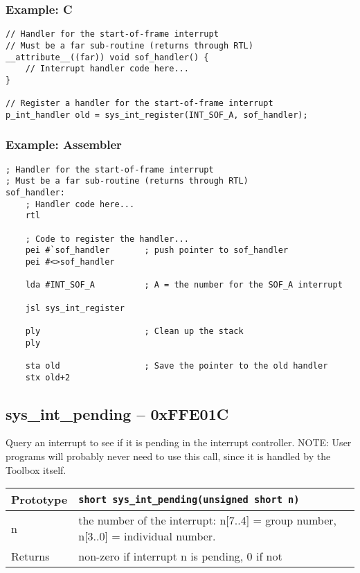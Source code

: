 \subsubsection*{Example: C}
\begin{lstlisting}
// Handler for the start-of-frame interrupt
// Must be a far sub-routine (returns through RTL)
__attribute__((far)) void sof_handler() {
	// Interrupt handler code here...
}

// Register a handler for the start-of-frame interrupt
p_int_handler old = sys_int_register(INT_SOF_A, sof_handler);
\end{lstlisting}

\subsubsection*{Example: Assembler}
\begin{verbatim}
; Handler for the start-of-frame interrupt
; Must be a far sub-routine (returns through RTL)
sof_handler:
    ; Handler code here...
    rtl

    ; Code to register the handler...
    pei #`sof_handler       ; push pointer to sof_handler
    pei #<>sof_handler

    lda #INT_SOF_A          ; A = the number for the SOF_A interrupt
	
    jsl sys_int_register

    ply                     ; Clean up the stack
    ply

    sta old                 ; Save the pointer to the old handler
    stx old+2
\end{verbatim}

\subsection*{sys\_int\_pending -- 0xFFE01C}
Query an interrupt to see if it is pending in the interrupt controller.
NOTE: User programs will probably never need to use this call, since it is handled by the Toolbox itself.

\bigskip

\begin{tabular}{|l||l|} \hline
Prototype & \lstinline!short sys_int_pending(unsigned short n)! \\ \hline
n & the number of the interrupt: n[7..4] = group number, n[3..0] = individual number. \\ \hline
Returns & non-zero if interrupt n is pending, 0 if not \\ \hline
\end{tabular}

